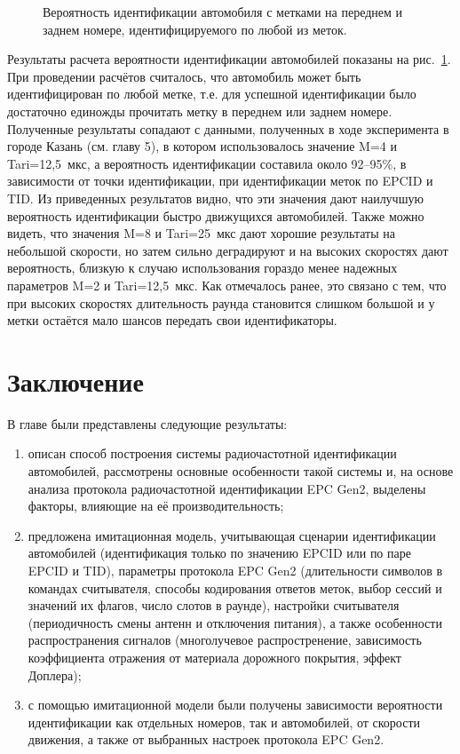 \begin{figure}[!t]
	\caption{Вероятность идентификации автомобиля с метками на переднем и заднем номере, идентифицируемого по любой из меток.}
	\label{fig:ch2_vehicle_identification_rate}
\end{figure}

Результаты расчета вероятности идентификации автомобилей показаны на рис.~\ref{fig:ch2_vehicle_identification_rate}. При проведении расчётов считалось, что автомобиль может быть идентифицирован по любой метке, т.е. для успешной идентификации было достаточно единожды прочитать метку в переднем или заднем номере. Полученные результаты сопадают с данными, полученных в ходе эксперимента в городе Казань (см. главу 5), в котором использовалось значение M=4 и Tari=12,5~мкс, а вероятность идентификации составила около 92--95\%, в зависимости от точки идентификации, при идентификации меток по EPCID и TID. Из приведенных результатов видно, что эти значения дают наилучшую вероятность идентификации быстро движущихся автомобилей. Также можно видеть, что значения M=8 и Tari=25~мкс дают хорошие результаты на небольшой скорости, но затем сильно деградируют и на высоких скоростях дают вероятность, близкую к случаю использования гораздо менее надежных параметров M=2 и Tari=12,5~мкс. Как отмечалось ранее, это связано с тем, что при высоких скоростях длительность раунда становится слишком большой и у метки остаётся мало шансов передать свои идентификаторы.



\section{Заключение}\label{sec:ch2_conclusion}
В главе были представлены следующие результаты:
\begin{enumerate}
	\item описан способ построения системы радиочастотной идентификации автомобилей, рассмотрены основные особенности такой системы и, на основе анализа протокола радиочастотной идентификации EPC Gen2, выделены факторы, влияющие на её производительность;
	\item предложена имитационная модель, учитывающая сценарии идентификации автомобилей (идентификация только по значению EPCID или по паре EPCID и TID), параметры протокола EPC Gen2 (длительности символов в командах считывателя, способы кодирования ответов меток, выбор сессий и значений их флагов, число слотов в раунде), настройки считывателя (периодичность смены антенн и отключения питания), а также особенности распространения сигналов (многолучевое распростренение, зависимость коэффициента отражения от материала дорожного покрытия, эффект Доплера);
	\item с помощью имитационной модели были получены зависимости вероятности идентификации как отдельных номеров, так и автомобилей, от скорости движения, а также от выбранных настроек протокола EPC Gen2.
\end{enumerate}

\FloatBarrier
